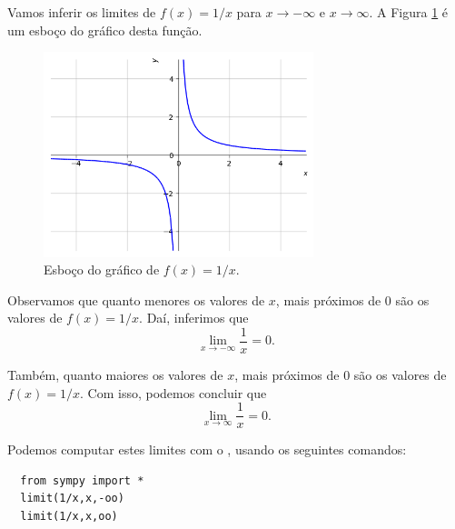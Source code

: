 \begin{ex}
  Vamos inferir os limites de $f(x) = 1/x$ para $x\to -\infty$ e $x\to \infty$. A Figura \ref{fig:lim_xinf_1x} é um esboço do gráfico desta função.

\begin{figure}[H]
  \centering
  \includegraphics[width=0.7\textwidth]{./cap_lim/dados/fig_lim_xinf_1x/fig_lim_xinf_1x}
  \caption{Esboço do gráfico de $f(x) = 1/x$.}
  \label{fig:lim_xinf_1x}
\end{figure}

Observamos que quanto menores os valores de $x$, mais próximos de $0$ são os valores de $f(x)=1/x$. Daí, inferimos que
\begin{equation}
  \lim_{x\to -\infty} \frac{1}{x} = 0.
\end{equation}

Também, quanto maiores os valores de $x$, mais próximos de $0$ são os valores de $f(x)=1/x$. Com isso, podemos concluir que
\begin{equation}
  \lim_{x\to \infty} \frac{1}{x} = 0.
\end{equation}

\ifispython
Podemos computar estes limites com o {\sympy}, usando os seguintes comandos:
\begin{lstlisting}
  from sympy import *
  limit(1/x,x,-oo)
  limit(1/x,x,oo)
\end{lstlisting}
\fi
\end{ex}

